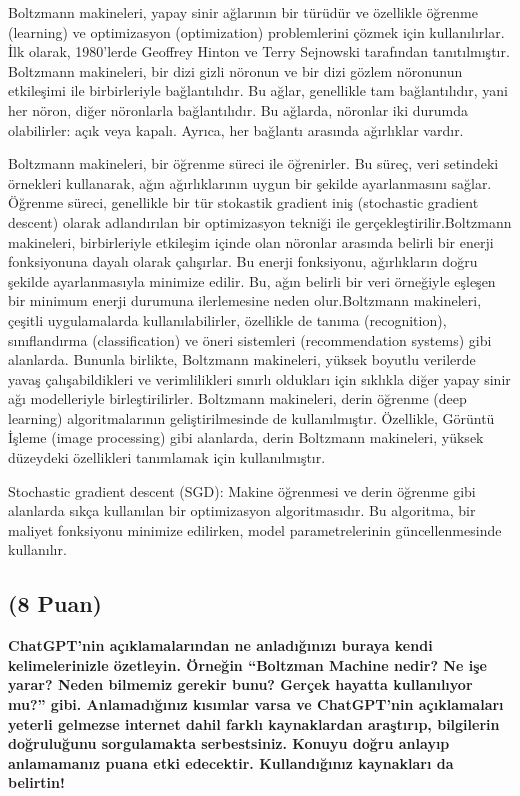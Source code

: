 \documentclass[11pt]{article}
\begin{document}
Boltzmann makineleri, yapay sinir ağlarının bir türüdür ve özellikle öğrenme (learning) ve optimizasyon (optimization) problemlerini çözmek için kullanılırlar. İlk olarak, 1980'lerde Geoffrey Hinton ve Terry Sejnowski tarafından tanıtılmıştır.
Boltzmann makineleri, bir dizi gizli nöronun ve bir dizi gözlem nöronunun etkileşimi ile birbirleriyle bağlantılıdır. Bu ağlar, genellikle tam bağlantılıdır, yani her nöron, diğer nöronlarla bağlantılıdır. Bu ağlarda, nöronlar iki durumda olabilirler: açık veya kapalı. Ayrıca, her bağlantı arasında ağırlıklar vardır.

Boltzmann makineleri, bir öğrenme süreci ile öğrenirler. Bu süreç, veri setindeki örnekleri kullanarak, ağın ağırlıklarının uygun bir şekilde ayarlanmasını sağlar. Öğrenme süreci, genellikle bir tür stokastik gradient iniş (stochastic gradient descent) olarak adlandırılan bir optimizasyon tekniği ile gerçekleştirilir.Boltzmann makineleri, birbirleriyle etkileşim içinde olan nöronlar arasında belirli bir enerji fonksiyonuna dayalı olarak çalışırlar. Bu enerji fonksiyonu, ağırlıkların doğru şekilde ayarlanmasıyla minimize edilir. Bu, ağın belirli bir veri örneğiyle eşleşen bir minimum enerji durumuna ilerlemesine neden olur.Boltzmann makineleri, çeşitli uygulamalarda kullanılabilirler, özellikle de tanıma (recognition), sınıflandırma (classification) ve öneri sistemleri (recommendation systems) gibi alanlarda. Bununla birlikte, Boltzmann makineleri, yüksek boyutlu verilerde yavaş çalışabildikleri ve verimlilikleri sınırlı oldukları için sıklıkla diğer yapay sinir ağı modelleriyle birleştirilirler.
Boltzmann makineleri, derin öğrenme (deep learning) algoritmalarının geliştirilmesinde de kullanılmıştır. Özellikle, Görüntü İşleme (image processing) gibi alanlarda, derin Boltzmann makineleri, yüksek düzeydeki özellikleri tanımlamak için kullanılmıştır.

Stochastic gradient descent (SGD): Makine öğrenmesi ve derin öğrenme gibi alanlarda sıkça kullanılan bir optimizasyon algoritmasıdır. Bu algoritma, bir maliyet fonksiyonu minimize edilirken, model parametrelerinin güncellenmesinde kullanılır.

\subsection{(8 Puan)} \textbf{ChatGPT’nin açıklamalarından ne anladığınızı buraya kendi kelimelerinizle özetleyin. Örneğin ``Boltzman Machine nedir? Ne işe yarar? Neden bilmemiz gerekir bunu? Gerçek hayatta kullanılıyor mu?'' gibi. Anlamadığınız kısımlar varsa ve ChatGPT’nin açıklamaları yeterli gelmezse internet dahil farklı kaynaklardan araştırıp, bilgilerin doğruluğunu sorgulamakta serbestsiniz. Konuyu doğru anlayıp anlamamanız puana etki edecektir. Kullandığınız kaynakları da belirtin!}
\end{document}
